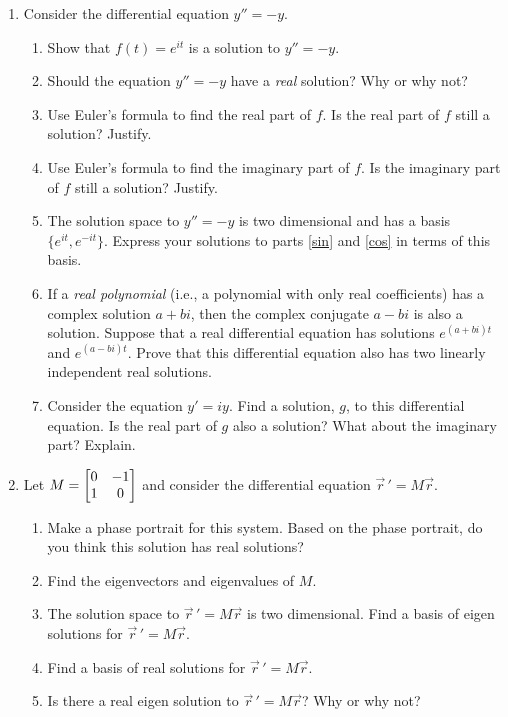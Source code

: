 \begin{enumerate}
	\item Consider the differential equation $y''=-y$.
	\begin{enumerate}
		\item Show that $f(t)=e^{it}$ is a solution to $y''=-y$.
		\item Should the equation $y''=-y$ have a \emph{real} solution? Why or why not?
		\item\label{sin} Use Euler's formula to find the real part of $f$. Is the real part of $f$ still a solution? Justify.
		\item\label{cos} Use Euler's formula to find the imaginary part of $f$. Is the imaginary part of $f$ still a solution? Justify.
		\item The solution space to $y''=-y$ is two dimensional and has a basis $\{e^{it}, e^{-it}\}$. Express your
		solutions to parts \ref{sin} and \ref{cos} in terms of this basis.
		\item\label{realsoln} If a \emph{real polynomial} (i.e., a polynomial with only real coefficients) has a complex solution $a+bi$, then
		the complex conjugate $a-bi$ is also a solution. Suppose that a real differential equation has solutions $e^{(a+bi)t}$
		and $e^{(a-bi)t}$. Prove that this differential equation also has two linearly independent real solutions.
		\item Consider the equation $y'=iy$. Find a solution, $g$, to this differential equation. Is the real part of $g$ also a solution? What 
		about the imaginary part? Explain.
	\end{enumerate}

	\item Let $M=\begin{bmatrix}0&-1\\1&0\end{bmatrix}$ and consider the differential equation $\vec r\,'=M\vec r$.
		\begin{enumerate}
			\item Make a phase portrait for this system. Based on the phase portrait, do you think this solution has real solutions?
			\item Find the eigenvectors and eigenvalues of $M$.
			\item The solution space to $\vec r\,'=M\vec r$ is two dimensional. Find a basis of eigen solutions for $\vec r\,'=M\vec r$.
			\item Find a basis of real solutions for $\vec r\,'=M\vec r$.
			\item Is there a real eigen solution to $\vec r\,'=M\vec r$? Why or why not?
		\end{enumerate}
\end{enumerate}